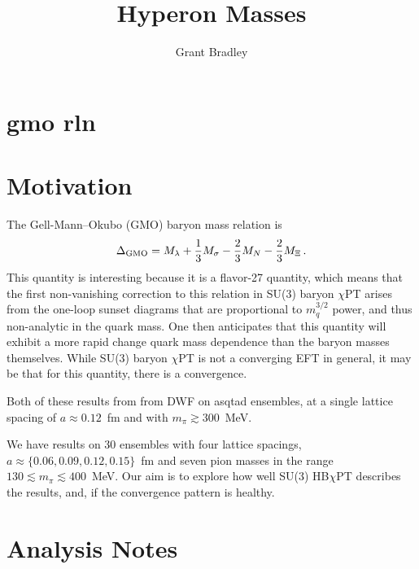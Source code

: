 \documentclass[12pt,tightenlines, raggedbottom, prd, notitlepage]{revtex4-1}
\begin{document}
\title{Hyperon Masses}
\author{Grant Bradley}
\maketitle

\section*{gmo rln }
\section{Motivation}
The Gell-Mann--Okubo (GMO) baryon mass relation is
\begin{equation}
\Delta_{\rm GMO} = M_\lambda +\frac{1}{3}M_\sigma -\frac{2}{3} M_N -\frac{2}{3} M_\Xi\, .
\end{equation}
This quantity is interesting because it is a flavor-27 quantity, which means that the first non-vanishing correction to this relation in SU(3) baryon $\chi$PT arises from the one-loop sunset diagrams that are proportional to $m_q^{3/2}$ power, and thus non-analytic in the quark mass.
One then anticipates that this quantity will exhibit a more rapid change quark mass dependence than the baryon masses themselves.
While SU(3) baryon $\chi$PT is not a converging EFT in general, it may be that for this quantity, there is a convergence.

Both of these results from from DWF on asqtad ensembles, at a single lattice spacing of $a\approx0.12$~fm and with $m_\pi \gtrsim300$~MeV.

We have results on 30 ensembles with four lattice spacings, $a\approx\{0.06, 0.09, 0.12, 0.15\}$~fm and seven pion masses in the range $130\lesssim m_\pi\lesssim400$~MeV.
Our aim is to explore how well SU(3) HB$\chi$PT describes the results, and, if the convergence pattern is healthy.




\section{Analysis Notes}
\end{document}
